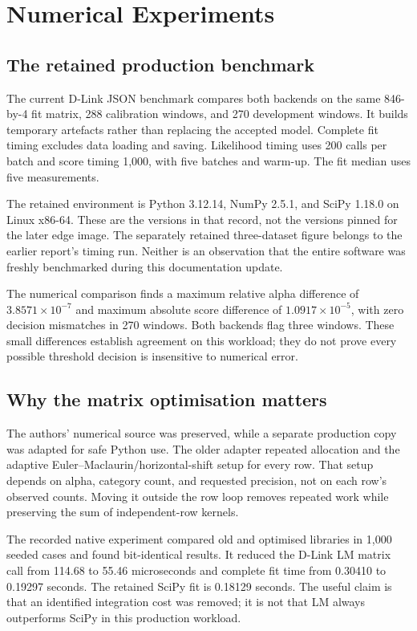\section{Numerical Experiments}

\subsection{The retained production benchmark}

The current D-Link JSON benchmark compares both backends on the same
846-by-4 fit matrix, 288 calibration windows, and 270 development windows.
It builds temporary artefacts rather than replacing the accepted model.
Complete fit timing excludes data loading and saving. Likelihood timing uses
200 calls per batch and score timing 1,000, with five batches and warm-up.
The fit median uses five measurements.



The retained environment is Python 3.12.14, NumPy 2.5.1, and SciPy 1.18.0 on
Linux x86-64. These are the versions in that record, not the versions pinned
for the later edge image. The separately retained three-dataset figure belongs
to the earlier report's timing run. Neither is an observation that the entire
software was freshly benchmarked during this documentation update.

The numerical comparison finds a maximum relative alpha difference of
$3.8571\times10^{-7}$ and maximum absolute score difference of
$1.0917\times10^{-5}$, with zero decision mismatches in 270 windows.
Both backends flag three windows. These small differences establish agreement
on this workload; they do not prove every possible threshold decision is
insensitive to numerical error.

\subsection{Why the matrix optimisation matters}

The authors' numerical source was preserved, while a separate production copy
was adapted for safe Python use. The older adapter repeated allocation and the
adaptive Euler--Maclaurin/horizontal-shift setup for every row.
That setup depends on alpha, category count, and requested precision, not on
each row's observed counts. Moving it outside the row loop removes repeated
work while preserving the sum of independent-row kernels.

The recorded native experiment compared old and optimised libraries in 1,000
seeded cases and found bit-identical results. It reduced the D-Link LM matrix
call from 114.68 to 55.46 microseconds and complete fit time from 0.30410 to
0.19297 seconds. The retained SciPy fit is 0.18129 seconds. The useful claim is
that an identified integration cost was removed; it is not that LM always
outperforms SciPy in this production workload.

